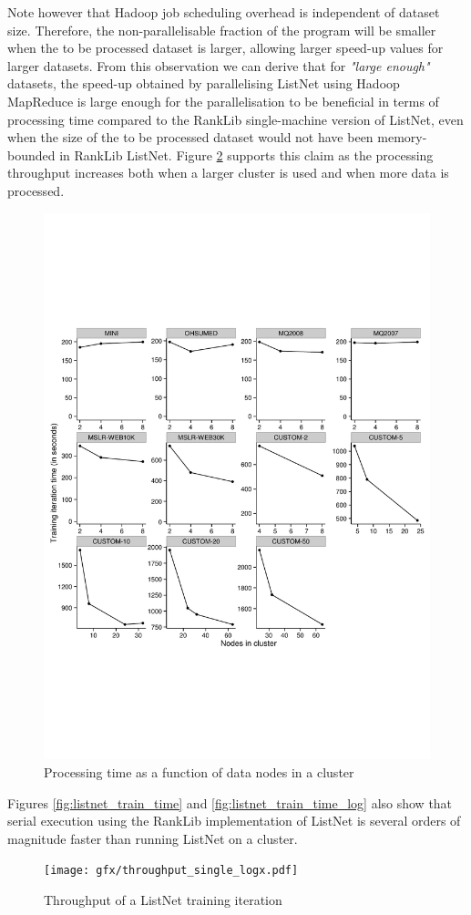 Note however that Hadoop job scheduling overhead is independent of dataset size. Therefore, the non-parallelisable fraction of the program will be smaller when the to be processed dataset is larger, allowing larger speed-up values for larger datasets. From this observation we can derive that for \emph{"large enough"} datasets, the speed-up obtained by parallelising ListNet using Hadoop MapReduce is large enough for the parallelisation to be beneficial in terms of processing time compared to the RankLib single-machine version of ListNet, even when the size of the to be processed dataset would not have been memory-bounded in RankLib ListNet. Figure \ref{fig:listnet_throughput} supports this claim as the processing throughput increases both when a larger cluster is used and when more data is processed.\\

\begin{figure}[!h]
\centering
\includegraphics[trim=0cm 5cm 0cm 5cm, scale=0.7]{gfx/speedup_faceted.pdf}
\caption{Processing time as a function of data nodes in a cluster}
\label{fig:speedup_train_time}
\end{figure}

Figures \ref{fig:listnet_train_time} and \ref{fig:listnet_train_time_log} also show that serial execution using the RankLib implementation of ListNet is several orders of magnitude faster than running ListNet on a cluster.
\begin{figure}[!h]
\centering
\texttt{[image: gfx/throughput\_single\_logx.pdf]}
\caption{Throughput of a ListNet training iteration}
\label{fig:listnet_throughput}
\end{figure}
